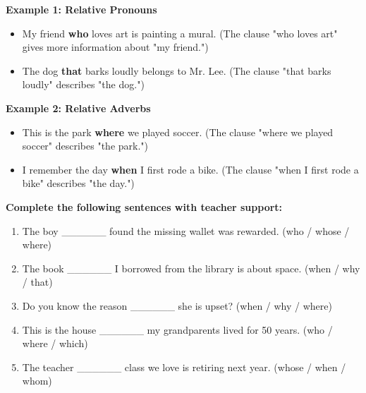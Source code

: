 \documentclass[12pt]{article}
\begin{document}
\begin{tcolorbox}[colframe=black!60, colback=white, 
coltitle=black, colbacktitle=black!15, fonttitle=\bfseries\Large, 
title=Examples, halign title=center, left=10pt, right=10pt, top=10pt, bottom=15pt]

\textbf{Example 1: Relative Pronouns}
\begin{itemize}
    \item My friend \textbf{who} loves art is painting a mural. (The clause "who loves art" gives more information about "my friend.")
    \item The dog \textbf{that} barks loudly belongs to Mr. Lee. (The clause "that barks loudly" describes "the dog.")
\end{itemize}

\textbf{Example 2: Relative Adverbs}
\begin{itemize}
    \item This is the park \textbf{where} we played soccer. (The clause "where we played soccer" describes "the park.")
    \item I remember the day \textbf{when} I first rode a bike. (The clause "when I first rode a bike" describes "the day.")
\end{itemize}

\end{tcolorbox}

\vspace{1em}

\begin{tcolorbox}[colframe=black!60, colback=white, 
coltitle=black, colbacktitle=black!15, fonttitle=\bfseries\Large, 
title=Guided Practice, halign title=center, left=10pt, right=10pt, top=10pt, bottom=15pt]
\textbf{Complete the following sentences with teacher support:}
\begin{enumerate}[itemsep=3em]
    \item The boy \_\_\_\_\_\_ found the missing wallet was rewarded. (who / whose / where)
    \item The book \_\_\_\_\_\_ I borrowed from the library is about space. (when / why / that)
    \item Do you know the reason \_\_\_\_\_\_ she is upset? (when / why / where)
    \item This is the house \_\_\_\_\_\_ my grandparents lived for 50 years. (who / where / which)
    \item The teacher \_\_\_\_\_\_ class we love is retiring next year. (whose / when / whom)
\end{enumerate}
\end{tcolorbox}
\end{document}
